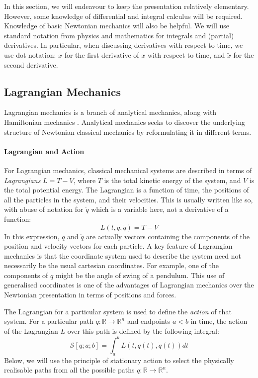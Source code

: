 \documentclass[preprint]{sigplanconf}
\theoremstyle{examplestyle}
\begin{document}
In this section, we will endeavour to keep the presentation relatively
elementary. However, some knowledge of differential and integral
calculus will be required. Knowledge of basic Newtonian mechanics will
also be helpful. We will use standard notation from physics and
mathematics for integrals and (partial) derivatives. In particular,
when discussing derivatives with respect to time, we use dot notation:
$\dot{x}$ for the first derivative of $x$ with respect to time, and
$\ddot{x}$ for the second derivative.

\subsection{Lagrangian Mechanics}

Lagrangian mechanics is a branch of analytical mechanics, along with
Hamiltonian mechanics
\cite{landau60mechanics,arnoldXXmathematical}. Analytical mechanics
seeks to discover the underlying structure of Newtonian classical
mechanics by reformulating it in different terms.

\paragraph{Lagrangian and Action}

For Lagrangian mechanics, classical mechanical systems are described
in terms of \emph{Lagrangians} $L = T - V$, where $T$ is the total
kinetic energy of the system, and $V$ is the total potential
energy. The Lagrangian is a function of time, the positions of all the
particles in the system, and their velocities. This is usually written
like so, with abuse of notation for $\dot{q}$ which is a variable
here, not a derivative of a function:
\begin{displaymath}
  L(t, q, \dot{q}) = T - V
\end{displaymath}
In this expression, $q$ and $\dot{q}$ are actually vectors containing
the components of the position and velocity vectors for each
particle. A key feature of Lagrangian mechanics is that the coordinate
system used to describe the system need not necessarily be the usual
cartesian coordinates. For example, one of the components of $q$ might
be the angle of swing of a pendulum. This use of generalised
coordinates is one of the advantages of Lagrangian mechanics over the
Newtonian presentation in terms of positions and forces.

The Lagrangian for a particular system is used to define the
\emph{action} of that system. For a particular path $q : \mathbb{R}
\to \mathbb{R}^n$ and endpoints $a < b$ in time, the action of the
Lagrangian $L$ over this path is defined by the following integral:
\begin{displaymath}
  \mathcal{S}[q;a;b] = \int_a^b L(t,q(t),\dot{q}(t)) \mathit{dt}
\end{displaymath}
Below, we will use the principle of stationary action to select the
physically realisable paths from all the possible paths $q :
\mathbb{R} \to \mathbb{R}^n$.
\end{document}
